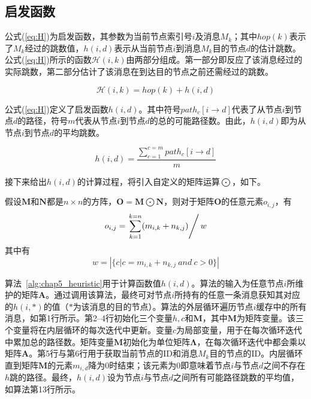 \subsection{启发函数}
\label{chap5:启发函数}

公式(\ref{eq:H})为启发函数，其参数为当前节点索引号$i$及消息$M_k$；其中$hop(k)$表示了$M_k$经过的跳数值，$h(i,d)$表示从当前节点$i$到消息$M_k$目的节点$d$的估计跳数。公式(\ref{eq:H})所示的函数$\mathcal{H}(i,k)$由两部分组成。第一部分即反应了该消息经过的实际跳数，第二部分估计了该消息在到达目的节点之前还需经过的跳数。

\begin{equation}
\label{eq:H}
\mathcal{H}(i,k) = hop(k) + h(i, d)
\end{equation}

公式(\ref{eq:H})定义了启发函数$h(i,d)$。其中符号$path_c[i\rightarrow d]$代表了从节点$i$到节点$d$的路径，符号$m$代表从节点$i$到节点$d$的总的可能路径数。由此，$h(i,d)$即为从节点$i$到节点$d$的平均跳数。

\begin{equation}
\label{eq:h}
h(i, d) = \frac{\sum_{c=1}^{c=m}path_c[i\longrightarrow d]}{m}
\end{equation}

接下来给出$h(i,d)$的计算过程，将引入自定义的矩阵运算$\bigodot$，如下。

\begin{definition}
\label{def:bigodot}
假设$\bm{M}$和$\bm{N}$都是$n\times n$的方阵，$\bm{O}=\bm{M}\bigodot \bm{N}$，则对于矩阵$\bm{O}$的任意元素$o_{i,j}$，有
\begin{displaymath}
o_{i,j}=\left.\sum_{k=1}^{k=n}(m_{i,k}+n_{k,j})\right/w
\end{displaymath}
其中有
\begin{displaymath}
w=\left|\{c|c=m_{i,k}+n_{k,j}~and~c>0\}\right|
\end{displaymath}
\end{definition}

算法~\ref{alg:chap5_heuristic}用于计算函数值$h(i,d)$。算法的输入为任意节点$i$所维护的矩阵$\bm{A}$。通过调用该算法，最终可对节点$i$所持有的任意一条消息获知其对应的$h(i,*)$的值（$*$为该消息的目的节点）。算法的外层循环遍历节点$i$缓存中的所有消息，如第1行所示。第2--4行初始化三个变量$h,c$和$\bm{M}$，其中$\bm{M}$为矩阵变量。该三个变量将在内层循环的每次迭代中更新。变量$c$为局部变量，用于在每次循环迭代中累加总的路径数。矩阵变量$\bm{M}$初始化为单位矩阵$\bm{\Lambda}$，在每次循环迭代中都会乘以矩阵$\bm{A}$。第5行与第6行用于获取当前节点的ID和消息$M_k$目的节点的ID。内层循环直到矩阵$\bm{M}$的元素$m_{i,d}$降为0时结束；该元素为0即意味着节点$i$与节点$d$之间不存在$h$跳的路径。最终，$h(i,d)$设为节点$i$与节点$d$之间所有可能路径跳数的平均值，如算法第13行所示。

